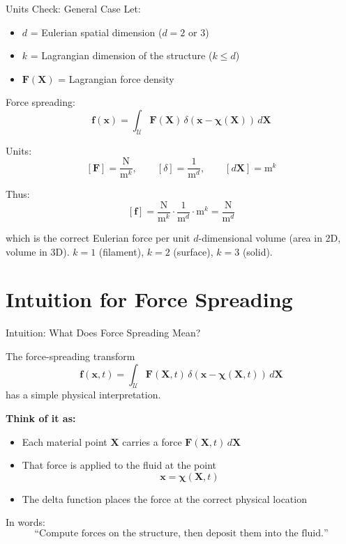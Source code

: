 \documentclass{beamer}
\begin{document}
\begin{frame}{Units Check: General Case}
\small
Let:
\begin{itemize}
    \item $d$ = Eulerian spatial dimension ($d=2$ or $3$)
    \item $k$ = Lagrangian dimension of the structure ($k \le d$)
    \item $\mathbf{F}(\mathbf{X})$ = Lagrangian force density
\end{itemize}

\medskip

Force spreading:
\[
\mathbf{f}(\mathbf{x})
=
\int_{\mathcal{U}}
\mathbf{F}(\mathbf{X})\,
\delta(\mathbf{x}-\boldsymbol{\chi}(\mathbf{X}))\,d\mathbf{X}
\]

\medskip

Units:
\[
[\mathbf{F}] = \frac{\text{N}}{\text{m}^k},
\qquad
[\delta] = \frac{1}{\text{m}^d},
\qquad
[d\mathbf{X}] = \text{m}^k
\]

\medskip

Thus:
\[
[\mathbf{f}]
=
\frac{\text{N}}{\text{m}^k}
\cdot
\frac{1}{\text{m}^d}
\cdot
\text{m}^k
=
\frac{\text{N}}{\text{m}^d}
\]

\medskip

which is the correct Eulerian force per unit $d$-dimensional volume
(area in 2D, volume in 3D). $k=1$ (filament), $k=2$ (surface), $k=3$ (solid).

\end{frame}

\section{Intuition for Force Spreading}
\begin{frame}{Intuition: What Does Force Spreading Mean?}

The force-spreading transform
\[
\mathbf{f}(\mathbf{x},t)
=
\int_{\mathcal{U}}
\mathbf{F}(\mathbf{X},t)\,
\delta(\mathbf{x}-\boldsymbol{\chi}(\mathbf{X},t))\,d\mathbf{X}
\]
has a simple physical interpretation.

\medskip

\textbf{Think of it as:}
\begin{itemize}
    \item Each material point $\mathbf{X}$ carries a force $\mathbf{F}(\mathbf{X},t)\,d\mathbf{X}$
    \item That force is applied to the fluid at the point
    \[
    \mathbf{x}=\boldsymbol{\chi}(\mathbf{X},t)
    \]
    \item The delta function places the force at the correct physical location
\end{itemize}

\medskip

In words:
\[
\text{``Compute forces on the structure, then deposit them into the fluid.''}
\]

\end{frame}
\end{document}
